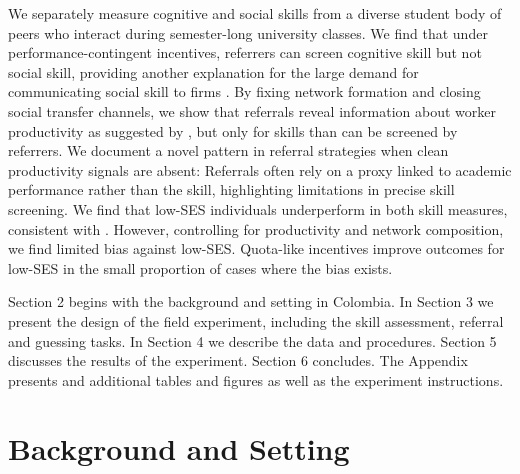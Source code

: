 \documentclass[11pt,a4paper,oneside]{article}
\begin{document}
We separately measure cognitive and social skills from a diverse student body of peers who interact during semester-long university classes. We find that under performance-contingent incentives, referrers can screen cognitive skill but not social skill, providing another explanation for the large demand for communicating social skill to firms \citep{bassi2022screening}. By fixing network formation and closing social transfer channels, we show that referrals reveal information about worker productivity as suggested by \citet{beaman_who_2012,beaman_job_2018,pallais_why_2016}, but only for skills than can be screened by referrers. We document a novel pattern in referral strategies when clean productivity signals are absent: Referrals often rely on a proxy linked to academic performance rather than the skill, highlighting limitations in precise skill screening. We find that low-SES individuals underperform in both skill measures, consistent with \citet{falk2021socioeconomic}. However, controlling for productivity and network composition, we find limited bias against low-SES. Quota-like incentives improve outcomes for low-SES in the small proportion of cases where the bias exists.

Section 2 begins with the background and setting in Colombia. In Section 3 we present the design of the field experiment, including the skill assessment, referral and guessing tasks. In Section 4 we describe the data and procedures. Section 5 discusses the results of the experiment. Section 6 concludes. The Appendix presents and additional tables and figures as well as the experiment instructions.


\section{Background and Setting}
\end{document}
